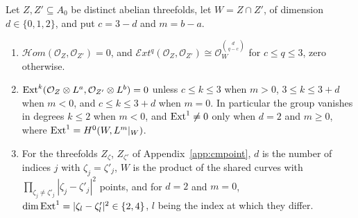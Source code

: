 \begin{lemma}\label{lem:cmmeet}
Let $Z,Z'\subseteq A_{0}$ be distinct abelian threefolds, let $W=Z\cap Z'$, of dimension $d\in\{0,1,2\}$, and put $c=3-d$ and $m=b-a$.
\begin{enumerate}[label=\textup{(\roman*)},leftmargin=2.4em,itemsep=2pt]
\item $\mathcal{H}om(\mathcal{O}_{Z},\mathcal{O}_{Z'})=0$, and $\mathcal{E}xt^{q}(\mathcal{O}_{Z},\mathcal{O}_{Z'})\cong\mathcal{O}_{W}^{\binom{d}{q-c}}$ for $c\le q\le3$, zero otherwise.
\item $\mathrm{Ext}^{k}(\mathcal{O}_{Z}\otimes L^{a},\mathcal{O}_{Z'}\otimes L^{b})=0$ unless $c\le k\le3$ when $m>0$, $3\le k\le3+d$ when $m<0$, and $c\le k\le3+d$ when $m=0$. In particular the group vanishes in degrees $k\le2$ when $m<0$, and $\mathrm{Ext}^{1}\ne0$ only when $d=2$ and $m\ge0$, where $\mathrm{Ext}^{1}=H^{0}(W,L^{m}|_{W})$.
\item For the threefolds $Z_{\zeta}$, $Z_{\zeta'}$ of Appendix~\ref{app:cmpoint}, $d$ is the number of indices $j$ with $\zeta_{j}=\zeta'_{j}$, $W$ is the product of the shared curves with $\prod_{\zeta_{j}\ne\zeta'_{j}}|\zeta_{j}-\zeta'_{j}|^{2}$ points, and for $d=2$ and $m=0$, $\dim\mathrm{Ext}^{1}=|\zeta_{l}-\zeta'_{l}|^{2}\in\{2,4\}$, $l$ being the index at which they differ.
\end{enumerate}
\end{lemma}

